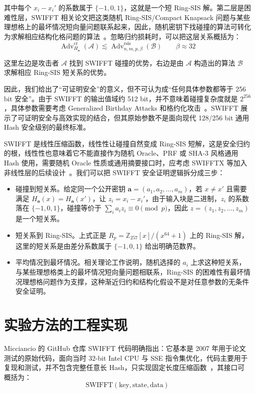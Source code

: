\documentclass{article}
\begin{document}
其中每个 $x_i-x_i'$ 的系数属于 $\{-1,0,1\}$，这就是一个短 Ring-SIS 解。第二层是困难性层，SWIFFT 相关论文把这类随机 Ring-SIS/Compact Knapsack 问题与某些理想格上的最坏情况短向量问题联系起来，因此，随机密钥下找碰撞的算法可转化为求解相应结构化格问题的算法~\cite{LM06,PR06,SWIFFT08}。忽略归约损耗时，可以把这层关系概括为：
\[ \operatorname{Adv}^{\mathrm{cr}}_{H_{\bm a}}(\mathcal{A})\lesssim\operatorname{Adv}^{\mathrm{rsis}}_{n,m,p,\beta}(\mathcal{B})\qquad\beta\approx32 \]

这里左边是攻击者 $\mathcal{A}$ 找到 SWIFFT 碰撞的优势，右边是由 $\mathcal{A}$ 构造出的算法 $\mathcal{B}$ 求解相应 Ring-SIS 短关系的优势。

因此，我们给出了“可证明安全”的意义，但不可认为成“任何具体参数都等于 256 bit 安全”。由于 SWIFFT 的输出值域约 512 bit，并不意味着碰撞复杂度就是 $2^{256}$，具体参数需要考虑 Generalized Birthday Attacks 和格约化攻击~\cite{Wagner02,SWIFFT08}。SWIFFT 展示了可证明安全与高效实现的结合，但其原始参数不是面向现代 128/256 bit 通用 Hash 安全级别的最终标准。

SWIFFT 是线性压缩函数，线性性让碰撞自然变成 Ring-SIS 短解，这是安全归约的根，线性性也意味着它不能直接作为随机 Oracle、PRF 或 SHA-3 风格通用 Hash 使用，需要随机 Oracle 性质或通用摘要接口时，应考虑 SWIFFTX 等加入非线性层的后续设计~\cite{SWIFFTX}。我们可以把 SWIFFT 安全证明逻辑拆分成三步：

\begin{itemize}
    \item[$\divideontimes$] 碰撞到短关系。给定同一个公开密钥 $\bm{a}=(a_1,a_2,\ldots,a_m)$，若 $x\neq x'$ 且需要满足 $H_{\bm{a}}(x)=H_{\bm{a}}(x')$，让 $z_i=x_i-x_i'$，由于输入块是二进制，$z_i$ 的系数落在 $\{-1,0,1\}$，碰撞等价于 $\displaystyle\sum_{i}a_iz_i\equiv0\pmod p$，因此 $z=(z_1,z_2,\ldots,z_m)$ 是一个短关系。
    \item[$\divideontimes$] 短关系到 Ring-SIS。上式正是 $R_p=\mathbb{Z}_{257}[x]/(x^{64}+1)$ 上的 Ring-SIS 解，这里的短关系是由差分系数属于 $\{-1,0,1\}$ 给出明确范数界。
    \item[$\divideontimes$] 平均情况到最坏情况。相关理论工作说明，随机选择的 $a_i$ 上求这种短关系，与某些理想格类上的最坏情况短向量问题相联系，Ring-SIS 的困难性有最坏情况理想格问题作为支撑，这种渐近归约和结构化假设不是对任意参数的无条件安全证明。
\end{itemize}



\section{实验方法的工程实现}
Micciancio 的 GitHub 仓库 SWIFFT 代码明确指出：它基本是 2007 年用于论文测试的原始代码，面向当时 32-bit Intel CPU 与 SSE 指令集优化，代码主要用于复现和测试，并不包含完整任意长 Hash，只实现固定长度压缩函数~\cite{Repo}，其接口可概括为：
\[ \text{SWIFFT}(\text{key},\text{state},\text{data}) \]
\end{document}
